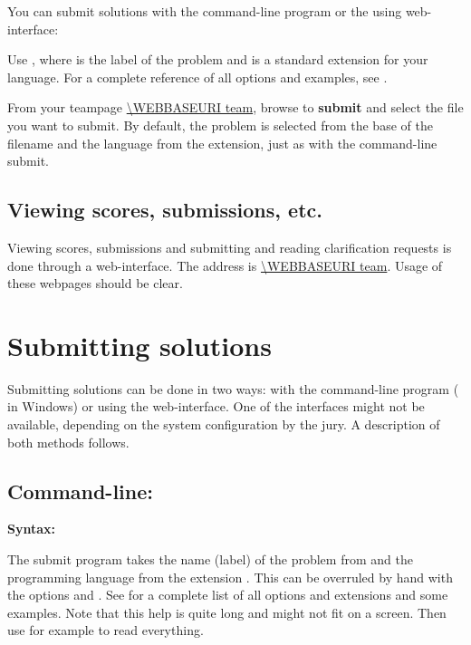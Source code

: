 You can submit solutions with the command-line program  or
the using web-interface:
\begin{description}[\breaklabel\setlabelstyle{\bfseries}]
\item[Command-line] 
Use , where  is the
label of the problem and  is a standard extension for
your language.  For a complete reference of all options and examples,
see .
\item[Web-interface]
From your teampage \url{\WEBBASEURI team}, browse to
\textbf{submit} and select the file you want to submit. By default,
the problem is selected from the base of the filename and the language
from the extension, just as with the command-line submit.
\end{description}

\subsection{Viewing scores, submissions, etc.}

Viewing scores, submissions and submitting and reading clarification
requests is done through a web-interface. The address is
\url{\WEBBASEURI team}. Usage of these webpages should be clear.

\newpage
\section{Submitting solutions}\label{submit}

Submitting solutions can be done in two ways: with the command-line
program  ( in Windows) or using the
web-interface. One of the interfaces might not be available, depending on
the system configuration by the jury. A description of both methods
follows.

\subsection{Command-line: }

\textbf{Syntax:} 

The submit program takes the name (label) of the problem from
 and the programming language from the extension
. This can be overruled by hand with the options
 and .
See  for a complete list of all options and
extensions and some examples. Note that this help is quite long and
might not fit on a screen. Then use for example
 to read everything.

